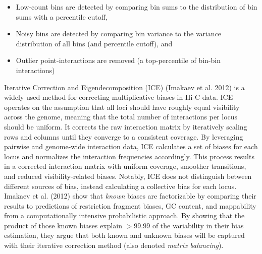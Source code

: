 \documentclass[
  11pt,
  a4paper,
]{scrbook}
\providecommand{\tightlist}{%
  \setlength{\itemsep}{0pt}\setlength{\parskip}{0pt}}
\begin{document}
\begin{itemize}
\tightlist
\item
  Low-count bins are detected by comparing bin sums to the distribution
  of bin sums with a percentile cutoff,
\item
  Noisy bins are detected by comparing bin variance to the variance
  distribution of all bins (and percentile cutoff), and
\item
  Outlier point-interactions are removed (a top-percentile of bin-bin
  interactions)
\end{itemize}

Iterative Correction and Eigendecomposition (ICE) (Imakaev et al. 2012)
is a widely used method for correcting multiplicative biases in Hi-C
data. ICE operates on the assumption that all loci should have roughly
equal visibility across the genome, meaning that the total number of
interactions per locus should be uniform. It corrects the raw
interaction matrix by iteratively scaling rows and columns until they
converge to a consistent coverage. By leveraging pairwise and
genome-wide interaction data, ICE calculates a set of biases for each
locus and normalizes the interaction frequencies accordingly. This
process results in a corrected interaction matrix with uniform coverage,
smoother transitions, and reduced visibility-related biases. Notably,
ICE does not distinguish between different sources of bias, instead
calculating a collective bias for each locus. Imakaev et al. (2012) show
that \emph{known} biases are factorizable by comparing their results to
predictions of restriction fragment biases, GC content, and mappability
from a computationally intensive probabilistic approach. By showing that
the product of those known biases explain \(>99.99%
\) of the variability in their bias estimation, they argue that both
known and unknown biases will be captured with their iterative
correction method (also denoted \emph{matrix balancing}).
\end{document}
